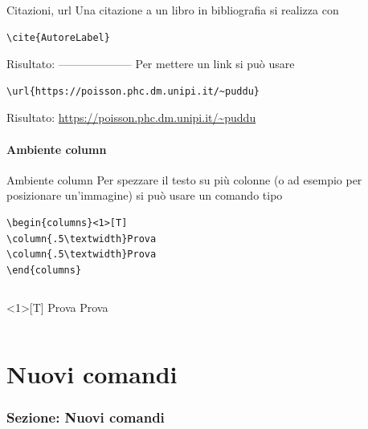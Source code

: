 \documentclass[aspectratio=169, compress]{beamer}
\begin{document}
\begin{frame}{Citazioni, url}
	Una citazione a un libro in bibliografia si realizza con
	\begin{verbatim}\cite{AutoreLabel}\end{verbatim}
	Risultato: \cite{AutoreLabel}
\newline --------------------\newline
	Per mettere un link si può usare
		\begin{verbatim}\url{https://poisson.phc.dm.unipi.it/~puddu}\end{verbatim}
	Risultato: \url{https://poisson.phc.dm.unipi.it/~puddu}
\end{frame}
\subsection{Ambiente column}
\begin{frame}[fragile]{Ambiente column}
Per spezzare il testo su più colonne (o ad esempio per posizionare un'immagine) si può usare un comando tipo
\begin{verbatim}
\begin{columns}<1>[T]
\column{.5\textwidth}Prova 
\column{.5\textwidth}Prova 
\end{columns} \end{verbatim}
\begin{columns}<1>[T]
Prova 
Prova 
\end{columns} 
\end{frame}
\part{Nuovi comandi}

\section{Sezione: Nuovi comandi}
\end{document}
